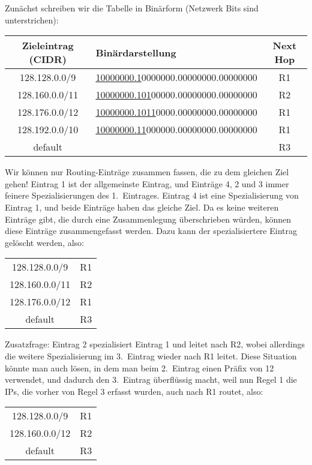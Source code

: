 Zunächst schreiben wir die Tabelle in Binärform (Netzwerk Bits sind unterstrichen):

\begin{center}
    \begin{tabular}{|c|l|c|}
        \hline
        Zieleintrag (CIDR) & Binärdarstellung & Next Hop \tabularnewline
        \hline
        128.128.0.0/9 & \underline{10000000.1}0000000.00000000.00000000 & R1 \tabularnewline
        128.160.0.0/11 & \underline{10000000.101}00000.00000000.00000000 & R2 \tabularnewline
        128.176.0.0/12 & \underline{10000000.1011}0000.00000000.00000000 & R1 \tabularnewline
        128.192.0.0/10 & \underline{10000000.11}000000.00000000.00000000 & R1 \tabularnewline
        default & & R3 \tabularnewline
        \hline
    \end{tabular}
\end{center}

Wir können nur Routing-Einträge zusammen fassen, die zu dem gleichen Ziel gehen!
Eintrag 1 ist der allgemeinste Eintrag, und Einträge 4, 2 und 3 immer feinere Spezialisierungen des 1.\ Eintrages.
Eintrag 4 ist eine Spezialisierung von Eintrag 1, und beide Einträge haben das gleiche Ziel.
Da es keine weiteren Einträge gibt, die durch eine Zusammenlegung überschrieben würden, können diese Einträge zusammengefasst werden.
Dazu kann der spezialisiertere Eintrag gelöscht werden, also:

\begin{center}
    \begin{tabular}{|c|c|}
        \hline
        128.128.0.0/9 & R1 \tabularnewline
        128.160.0.0/11 & R2 \tabularnewline
        128.176.0.0/12 & R1 \tabularnewline
        default & R3 \tabularnewline
        \hline
    \end{tabular}
\end{center}

Zusatzfrage:
Eintrag 2 spezialisiert Eintrag 1 und leitet nach R2, wobei allerdings die weitere Spezialisierung im 3.\ Eintrag wieder nach R1 leitet.
Diese Situation könnte man auch lösen, in dem man beim 2.\ Eintrag einen Präfix von 12 verwendet,
und dadurch den 3.\ Eintrag überflüssig macht, weil nun Regel 1 die IPs, die vorher von Regel 3 erfasst wurden, auch nach R1 routet, also:

\begin{center}
    \begin{tabular}{|c|c|}
        \hline
        128.128.0.0/9 & R1 \tabularnewline
        128.160.0.0/12 & R2 \tabularnewline
        default & R3 \tabularnewline
        \hline
    \end{tabular}
\end{center}
